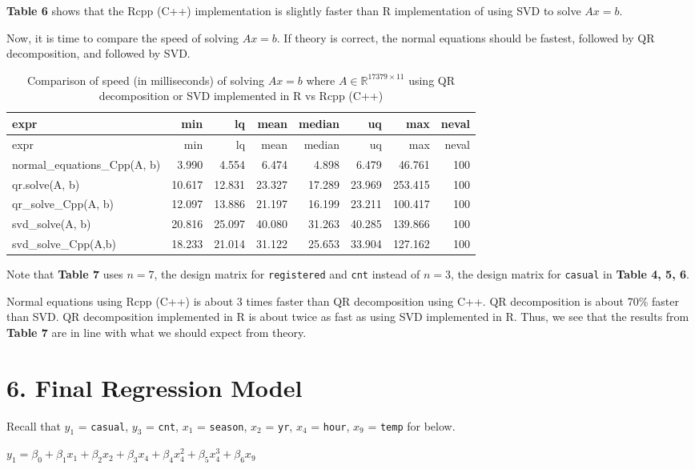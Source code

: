 \documentclass[
]{article}
\begin{document}
\textbf{Table 6} shows that the Rcpp (C++) implementation is slightly
faster than R implementation of using SVD to solve \(Ax = b\).

Now, it is time to compare the speed of solving \(Ax = b\). If theory is
correct, the normal equations should be fastest, followed by QR
decomposition, and followed by SVD.

\begin{longtable}[]{@{}lrrrrrrr@{}}
\caption{Comparison of speed (in milliseconds) of solving \(Ax = b\)
where \(A \in \mathbb{R}^{17379 \times 11}\) using QR decomposition or
SVD implemented in R vs Rcpp (C++)}\tabularnewline
\toprule
expr & min & lq & mean & median & uq & max & neval\tabularnewline
\midrule
\endfirsthead
\toprule
expr & min & lq & mean & median & uq & max & neval\tabularnewline
\midrule
\endhead
normal\_equations\_Cpp(A, b) & 3.990 & 4.554 & 6.474 & 4.898 & 6.479 &
46.761 & 100\tabularnewline
qr.solve(A, b) & 10.617 & 12.831 & 23.327 & 17.289 & 23.969 & 253.415 &
100\tabularnewline
qr\_solve\_Cpp(A, b) & 12.097 & 13.886 & 21.197 & 16.199 & 23.211 &
100.417 & 100\tabularnewline
svd\_solve(A, b) & 20.816 & 25.097 & 40.080 & 31.263 & 40.285 & 139.866
& 100\tabularnewline
svd\_solve\_Cpp(A,b) & 18.233 & 21.014 & 31.122 & 25.653 & 33.904 &
127.162 & 100\tabularnewline
\bottomrule
\end{longtable}

Note that \textbf{Table 7} uses \(n=7\), the design matrix for
\texttt{registered} and \texttt{cnt} instead of \(n=3\), the design
matrix for \texttt{casual} in \textbf{Table 4, 5, 6}.

Normal equations using Rcpp (C++) is about 3 times faster than QR
decomposition using C++. QR decomposition is about 70\% faster than SVD.
QR decomposition implemented in R is about twice as fast as using SVD
implemented in R. Thus, we see that the results from \textbf{Table 7}
are in line with what we should expect from theory.

\hypertarget{final-regression-model}{%
\section{6. Final Regression Model}\label{final-regression-model}}

Recall that \(y_{1}\) = \texttt{casual}, \(y_{3}\) = \texttt{cnt},
\(x_{1}\) = \texttt{season}, \(x_{2}\) = \texttt{yr}, \(x_{4}\) =
\texttt{hour}, \(x_{9}\) = \texttt{temp} for below.

\(y_{1} = \beta_{0} + \beta_{1}x_{1} + \beta_{2}x_{2} + \beta_{3}x_{4} + \beta_{4}x_{4}^{2} + \beta_{5}x_{4}^{3} + \beta_{6}x_{9}\)
\end{document}
